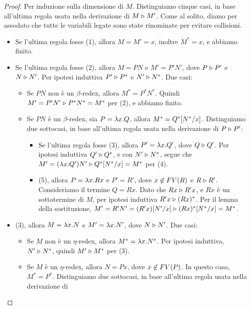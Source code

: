 \documentclass{article}
\begin{document}
\begin{proof}
  Per induzione sulla dimensione di $M$. Distinguiamo cinque casi,
  in base all'ultima regola usata nella derivazione di $M \mathrel{\triangleright} M'$.
  Come al solito, diamo per assodato che tutte le variabili legate sono state
  rinominate per evitare collisioni.
  \begin{itemize}
  \item Se l'ultima regola fosse (1), allora $M=M'=x$, inoltre $M^*=x$, e abbiamo
    finito.
  \item Se l'ultima regola fosse (2), allora $M=PN$ e $M'=P'N'$, dove
    $P\mathrel{\triangleright} P'$ e $N\mathrel{\triangleright} N'$. Per
    ipotesi induttiva $P'\mathrel{\triangleright} P^*$ e $N'\mathrel{\triangleright} N^*$. Due casi:
    \begin{itemize}
    \item Se $PN$ non \`e un $\beta$-redex, allora $M^*=P^*N^*$. Quindi
      $M'=P'N'\mathrel{\triangleright} P^*N^*=M^*$ per (2), e abbiamo finito.
    \item Se $PN$ \`e un $\beta$-redex, sia $P=\lambda x.Q$, allora
      $M^*=Q^*[N^*/x]$. Distinguiamo due sottocasi,
      in base all'ultima regola usata nella derivazione di $P\mathrel{\triangleright} P'$:
      \begin{itemize} 
      \item Se l'ultima regola fosse (3), allora $P'=\lambda x.Q'$, dove
        $Q\mathrel{\triangleright} Q'$.  Per ipotesi induttiva $Q' \mathrel{\triangleright} Q^*$, e con
        $N' \mathrel{\triangleright} N^*$, segue che $M' = (\lambda x.Q')N' \mathrel{\triangleright}
        Q^*[N^*/x] = M^*$ per (4).
      \item (5), allora $P=\lambda x.Rx$ e $P'=R'$,
        dove $x\not\in FV(R)$ e $R\mathrel{\triangleright} R'$. Consideriamo il termine
        $Q=Rx$.  Dato che $Rx \mathrel{\triangleright} R'x$, e $Rx$ \`e un sottotermine di $M$, per
        ipotesi induttiva $R'x \mathrel{\triangleright} (Rx)^*$. Per il lemma della
        sostituzione, $M' = R'N' = (R'x)[N'/x] \mathrel{\triangleright}
        (Rx)^*[N^*/x] = M^*$.
      \end{itemize}
    \end{itemize}
  \item (3), allora $M = \lambda x.N$ e $M' = \lambda
    x.N'$, dove $N\mathrel{\triangleright} N'$. Due casi:
    \begin{itemize}
    \item Se $M$ non \`e un $\eta$-redex, allora $M^*=\lambda x.N^*$. Per
      ipotesi induttiva, $N'\mathrel{\triangleright} N^*$, quindi $M'\mathrel{\triangleright} M^*$ per (3).
    \item Se $M$ \`e un $\eta$-redex, allora $N=Px$, dove
      $x\not\in FV(P)$. In questo caso, $M^*=P^*$. Distinguiamo due
      sottocasi, in base all'ultima regola usata nella derivazione di

\end{itemize}
\end{itemize}
\end{proof}
\end{document}
